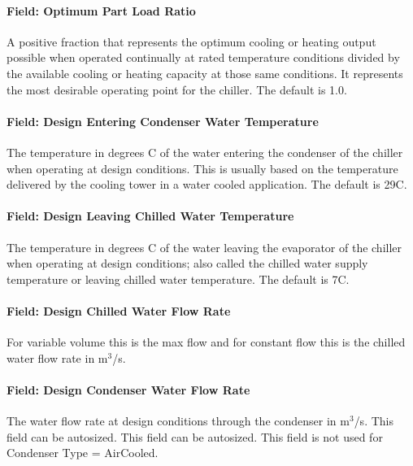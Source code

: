 \paragraph{Field: Optimum Part Load Ratio}\label{field-optimum-part-load-ratio-7}

A positive fraction that represents the optimum cooling or heating output possible when operated continually at rated temperature conditions divided by the available cooling or heating capacity at those same conditions. It represents the most desirable operating point for the chiller. The default is 1.0.

\paragraph{Field: Design Entering Condenser Water Temperature}\label{field-design-entering-condenser-water-temperature}

The temperature in degrees C of the water entering the condenser of the chiller when operating at design conditions. This is usually based on the temperature delivered by the cooling tower in a water cooled application. The default is 29C.

\paragraph{Field: Design Leaving Chilled Water Temperature}\label{field-design-leaving-chilled-water-temperature}

The temperature in degrees C of the water leaving the evaporator of the chiller when operating at design conditions; also called the chilled water supply temperature or leaving chilled water temperature. The default is 7C.

\paragraph{Field: Design Chilled Water Flow Rate}\label{field-design-chilled-water-flow-rate-6}

For variable volume this is the max flow and for constant flow this is the chilled water flow rate in m\(^{3}\)/s.

\paragraph{Field: Design Condenser Water Flow Rate}\label{field-design-condenser-water-flow-rate-5}

The water flow rate at design conditions through the condenser in m\(^{3}\)/s. This field can be autosized. This field can be autosized. This field is not used for Condenser Type = AirCooled.

